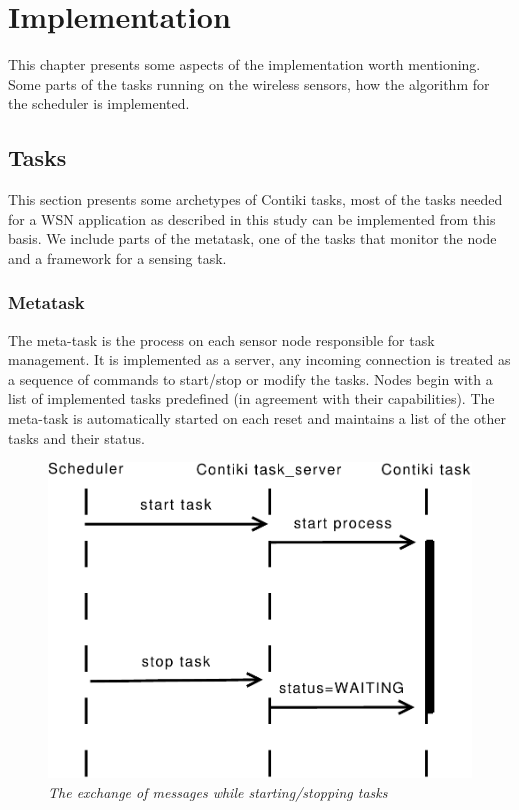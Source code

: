 \normalfont\normalsize
\chapter{Implementation}

This chapter presents some aspects of the implementation worth mentioning. Some parts of the tasks running on the wireless sensors,
how the algorithm for the scheduler is implemented.

\section{Tasks}

This section presents some archetypes of Contiki tasks, most of the tasks needed for a WSN application as described in this
study can be implemented from this basis. We include parts of the metatask, one of the tasks that monitor the node and 
a framework for a sensing task.

\subsection{Metatask}

The meta-task is the process on each sensor node responsible for task management. It is implemented as a server, any incoming connection
is treated as a sequence of commands to start/stop or modify the tasks. Nodes begin with a list of implemented tasks predefined (in
agreement with their capabilities). The meta-task is automatically started on each reset and maintains a list of the other tasks and their
status.
\begin{figure}[ht]
 \begin{center}
  \includegraphics[scale=0.5]{implementation/start_task.pdf}
 \end{center}
 \caption{\small \itshape{The exchange of messages while starting/stopping tasks}}
\end{figure}

